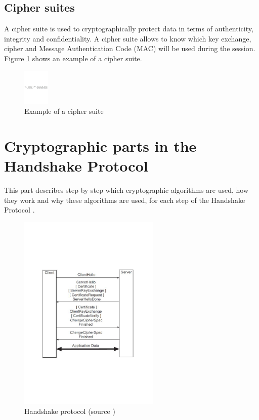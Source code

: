 \subsection{Cipher suites}
\label{tls_ciph_suite}
A cipher suite \cite{RFC5246} is used to cryptographically protect data in terms
of authenticity, integrity and confidentiality.
A cipher suite allows to know which key exchange, cipher and Message
Authentication Code (MAC) will be used during the session. Figure
\ref{fig:tls_ciph_suite} shows an example of a cipher suite.\newline
 

\begin{figure}[!ht]
\centering
\includegraphics[trim=0cm 13.5cm 0cm 13.5cm,
height=1.75cm]{figures/tls_cipher_suite.pdf}
\caption{Example of a cipher suite}
\label{fig:tls_ciph_suite}

\end{figure}

\newpage

\section{Cryptographic parts in the Handshake Protocol}

This part describes step by step which cryptographic algorithms are used, how
they work and why these algorithms are used, for each step of the Handshake
Protocol \cite{RFC5246}.

\begin{figure}[!ht]
\centering
\includegraphics[trim=0cm 7cm 0cm 7cm,
height=9.5cm]{figures/tls_exg.pdf}
\caption{Handshake protocol (source \cite{book2})}
\label{fig:tls_exg}

\end{figure}

